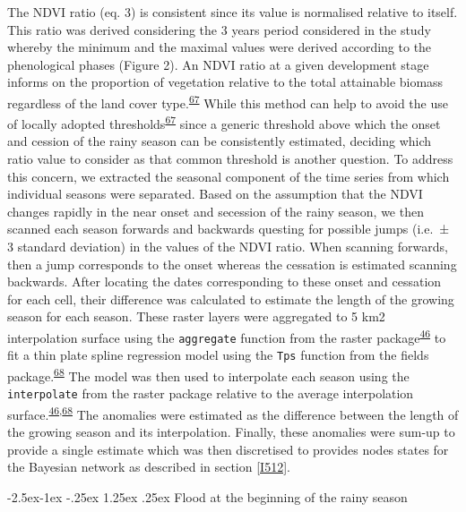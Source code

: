 \documentclass[12pt,oneside]{article}
\makeatletter
\renewcommand\paragraph{\@startsection{paragraph}{4}{\z@}%
            {-2.5ex\@plus -1ex \@minus -.25ex}%
            {1.25ex \@plus .25ex}%
            {\normalfont\normalsize\bfseries}}
\makeatother
\begin{document}
The NDVI ratio (eq. 3) is consistent since its value is normalised relative to itself. This ratio was derived considering the 3 years period considered in the study whereby the minimum and the maximal values were derived according to the phenological phases (Figure 2). An NDVI ratio at a given development stage informs on the proportion of vegetation relative to the total attainable biomass regardless of the land cover type.\textsuperscript{\protect\hyperlink{ref-White_et_al_1997}{67}} While this method can help to avoid the use of locally adopted thresholds\textsuperscript{\protect\hyperlink{ref-White_et_al_1997}{67}} since a generic threshold above which the onset and cession of the rainy season can be consistently estimated, deciding which ratio value to consider as that common threshold is another question. To address this concern, we extracted the seasonal component of the time series from which individual seasons were separated. Based on the assumption that the NDVI changes rapidly in the near onset and secession of the rainy season, we then scanned each season forwards and backwards questing for possible jumps (i.e.~± 3 standard deviation) in the values of the NDVI ratio. When scanning forwards, then a jump corresponds to the onset whereas the cessation is estimated scanning backwards. After locating the dates corresponding to these onset and cessation for each cell, their difference was calculated to estimate the length of the growing season for each season. These raster layers were aggregated to 5 km2 interpolation surface using the \texttt{aggregate} function from the raster package\textsuperscript{\protect\hyperlink{ref-Hijmans_2019}{46}} to fit a thin plate spline regression model using the \texttt{Tps} function from the fields package.\textsuperscript{\protect\hyperlink{ref-Nychka_et_al_2018}{68}} The model was then used to interpolate each season using the \texttt{interpolate} from the raster package relative to the average interpolation surface.\textsuperscript{\protect\hyperlink{ref-Hijmans_2019}{46},\protect\hyperlink{ref-Nychka_et_al_2018}{68}} The anomalies were estimated as the difference between the length of the growing season and its interpolation. Finally, these anomalies were sum-up to provide a single estimate which was then discretised to provides nodes states for the Bayesian network as described in section \ref{I512}.

\hypertarget{I529}{%
\paragraph{Flood at the beginning of the rainy season}\label{I529}}
\end{document}

